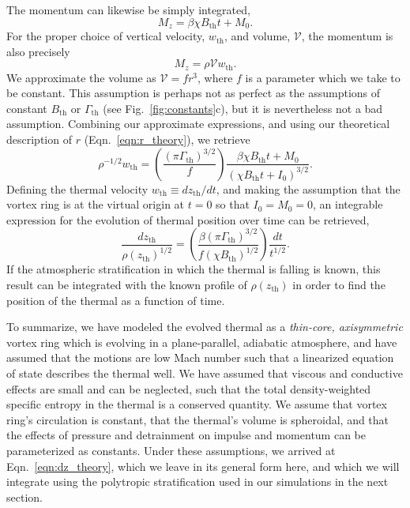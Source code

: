 \documentclass[twocolumn, amsmath, amsfonts, amssymb, trackchanges]{aastex62}
\begin{document}
The momentum can likewise be simply integrated,
\begin{equation*}
M_z = \beta\chi B_{\text{th}} t + M_0.
\end{equation*}
For the proper choice of vertical velocity, $w_{\text{th}}$, and volume, $\mathcal{V}$, the momentum is also precisely 
\begin{equation*}
M_z = \rho \mathcal{V} w_{\text{th}}.
\end{equation*}
We approximate the volume as $\mathcal{V} = f r^3$, where $f$ is a parameter which we take to be constant. 
This assumption is perhaps not as perfect as the assumptions of constant $B_{\text{th}}$ or $\Gamma_{\text{th}}$ (see Fig.~\ref{fig:constants}c), but it is nevertheless not a bad assumption. 
Combining our approximate expressions, and using our theoretical description of $r$ (Eqn.~\ref{eqn:r_theory}), we retrieve
\begin{equation}
\rho^{-1/2} w_{\text{th}} = \left(\frac{(\pi \Gamma_{\text{th}})^{3/2}}{f}\right)\frac{\beta\chi B_{\text{th}} t + M_0}{(\chi B_{\text{th}} t + I_0)^{3/2}}.
\end{equation}
Defining the thermal velocity $w_{\text{th}} \equiv dz_{\text{th}}/dt$, and making the assumption that the vortex ring is at the virtual origin at $t = 0$ so that $I_0 = M_0 = 0$, an integrable expression for the evolution of thermal position over time can be retrieved,
\begin{equation}
\frac{dz_{\text{th}}}{\rho(z_{\text{th}})^{1/2}} =
\left(\frac{\beta(\pi\Gamma_{\text{th}})^{3/2}}{f(\chi B_{\text{th}})^{1/2}}\right)\frac{dt}{t^{1/2}}.
\label{eqn:dz_theory}
\end{equation}
If the atmospheric stratification in which the thermal is falling is known, this result can be integrated with the known profile of $\rho(z_{\text{th}})$ in order to find the position of the thermal as a function of time. 

To summarize, we have modeled the evolved thermal as a \emph{thin-core, axisymmetric} vortex ring which is evolving in a plane-parallel, adiabatic atmosphere, and have assumed that the motions are low Mach number such that a linearized equation of state describes the thermal well.
We have assumed that viscous and conductive effects are small and can be neglected, such that the total density-weighted specific entropy in the thermal is a conserved quantity.
We assume that vortex ring's circulation is constant, that the thermal's volume is spheroidal, and that the effects of pressure and detrainment on impulse and momentum can be parameterized as constants.
Under these assumptions, we arrived at Eqn.~\ref{eqn:dz_theory}, which we leave in its general form here, and which we will integrate using the polytropic stratification used in our simulations in the next section.
\end{document}
